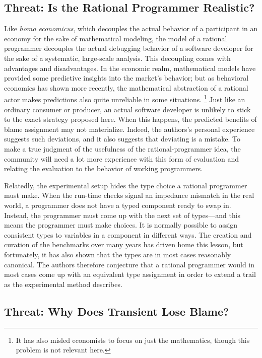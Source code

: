 \subsection{Threat: Is the Rational Programmer Realistic?}

Like {\em homo economicus\/}, which decouples the actual behavior of a
participant in an economy for the sake of mathematical modeling, the model of a
rational programmer decouples the actual debugging behavior of a software
developer for the sake of a systematic, large-scale analysis. This decoupling
comes with advantages and disadvantages. In the economic realm, mathematical models
have provided some predictive insights into the market's behavior; but as
behavioral economics has shown more recently, the mathematical abstraction of a
rational actor makes predictions also quite unreliable in some situations.
\footnote{It has also misled economists to focus on just the mathematics, though
this problem is not relevant here.}  Just like an ordinary consumer or producer,
an actual software developer is unlikely to stick to the exact strategy proposed
here. When this happens, the predicted benefits of blame assignment may not
materialize. Indeed, the authors's personal experience suggests such deviations, and
it also suggests that deviating is a mistake. To make a true judgment of the
usefulness of the rational-programmer idea, the community will need a lot more
experience with this form of evaluation and relating the evaluation to the
behavior of working programmers.

Relatedly, the experimental setup hides the type choice a rational programmer must make. When the
run-time checks signal an impedance mismatch in the real world, a programmer
does not have a typed component ready to swap in. Instead, the programmer must
come up with the next set of types---and this means the programmer must make
choices. It is normally possible to assign consistent types to variables in a
component in different ways. The creation and curation of the benchmarks over
many years has driven home this lesson, but fortunately, it has also shown that
the types are in most cases reasonably canonical.  The authors therefore conjecture that
a rational programmer would in most cases come up with an equivalent type
assignment in order to extend a trail as the experimental method describes.

\subsection{Threat: Why Does Transient Lose Blame?} \label{sec:threat:transient}

